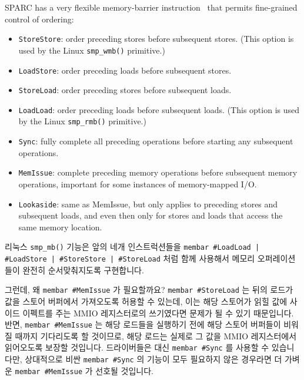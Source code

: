 SPARC has a very flexible memory-barrier instruction~\cite{SPARC94}
that permits fine-grained control of ordering:
\begin{itemize}
\item	{\tt StoreStore}: order preceding stores before subsequent stores.
	(This option is used by the Linux {\tt smp\_wmb()} primitive.)
\item	{\tt LoadStore}: order preceding loads before subsequent stores.
\item	{\tt StoreLoad}: order preceding stores before subsequent loads.
\item	{\tt LoadLoad}: order preceding loads before subsequent loads.
	(This option is used by the Linux {\tt smp\_rmb()} primitive.)
\item	{\tt Sync}: fully complete all preceding operations before starting
	any subsequent operations.
\item	{\tt MemIssue}: complete preceding memory operations before subsequent
	memory operations, important for some instances of memory-mapped
	I/O.
\item	{\tt Lookaside}: same as MemIssue, but only applies to preceding stores
	and subsequent loads, and even then only for stores and loads that
	access the same memory location.
\end{itemize}
\fi

리눅스 {\tt smp\_mb()} 기능은 앞의 네개 인스트럭션들을
{\tt membar \#LoadLoad | \#LoadStore | \#StoreStore | \#StoreLoad} 처럼
함께 사용해서 메모리 오퍼레이션들이 완전히 순서맞춰지도록 구현합니다.

그런데, 왜 {\tt membar \#MemIssue} 가 필요할까요?
{\tt membar \#StoreLoad} 는 뒤의 로드가 값을 스토어 버퍼에서 가져오도록 허용할
수 있는데, 이는 해당 스토어가 읽힐 값에 사이드 이펙트를 주는 MMIO 레지스터로의
쓰기였다면 문제가 될 수 있기 때문입니다.
반면, {\tt membar \#MemIssue} 는 해당 로드들을 실행하기 전에 해당 스토어
버퍼들이 비워질 때까지 기다리도록 할 것이므로, 해당 로드는 실제로 그 값을 MMIO
레지스터에서 읽어오도록 보장할 것입니다.
드라이버들은 대신 {\tt membar \#Sync} 를 사용할 수 있습니다만, 상대적으로 비싼
{\tt membar \#Sync} 의 기능이 모두 필요하지 않은 경우라면 더 가벼운 {\tt membar
\#MemIssue} 가 선호될 것입니다.

